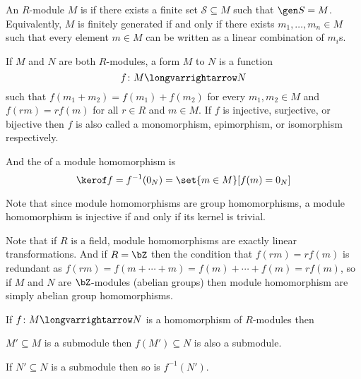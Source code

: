 \documentclass[10pt]{article}
\let\longto=\longvarrightarrow
\begin{document}


\bigskip

\begin{defn*}

    An $R$-module $M$ is  if there exists a finite set $\mathscr S\subseteq M$ such that $\gen S=M$.
    Equivalently, $M$ is finitely generated if and only if there exists $m_1,\dots,m_n\in M$ such that every element $m\in M$ can be written as a linear combination of $m_i$s.

\end{defn*}

\begin{defn*}

    If $M$ and $N$ are both $R$-modules, a  form $M$ to $N$ is a function
    \[ f\colon M\longto N \]
    such that $f(m_1+m_2)=f(m_1)+f(m_2)$ for every $m_1,m_2\in M$ and $f(rm)=rf(m)$ for all $r\in R$ and $m\in M$.
    If $f$ is injective, surjective, or bijective then $f$ is also called a monomorphism, epimorphism, or isomorphism respectively.

    And the  of a module homomorphism is
    \[ \kerof f = f^{-1}(0_N) = \set{m\in M}[f(m)=0_N] \]

\end{defn*}

Note that since module homomorphisms are group homomorphisms, a module homomorphism is injective if and only if its kernel is trivial.

Note that if $R$ is a field, module homomorphisms are exactly linear transformations.
And if $R=\bZ$ then the condition that $f(rm)=rf(m)$ is redundant as $f(rm)=f(m+\cdots+m)=f(m)+\cdots+f(m)=rf(m)$, so if $M$ and $N$ are $\bZ$-modules (abelian groups) then module homomorphism are simply
abelian group homomorphisms.

\begin{prop*}

    If $f\colon M\longto N$ is a homomorphism of $R$-modules then
    \benum
        \item $M'\subseteq M$ is a submodule then $f(M')\subseteq N$ is also a submodule.
        \item If $N'\subseteq N$ is a submodule then so is $f^{-1}(N')$.
    \eenum

\end{prop*}
\end{document}
